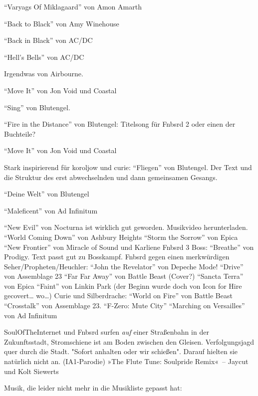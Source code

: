 “Varyags Of Miklagaard” von Amon Amarth

“Back to Black” von Amy Winehouse

“Back in Black” von AC/DC

“Hell’s Bells” von AC/DC

Irgendwas von Airbourne.

“Move It” von Jon Void und Coastal

“Sing” von Blutengel.

“Fire in the Distance” von Blutengel: Titelsong für Fnbsrd 2 oder einen der Buchteile?

“Move It” von Jon Void und Coastal

Stark inspirierend für koroljow und curie: “Fliegen” von Blutengel. Der Text und die Struktur des erst abwechselnden und dann gemeinsamen Gesangs.

“Deine Welt” von Blutengel

“Maleficent” von Ad Infinitum

“New Evil” von Nocturna ist wirklich gut geworden. Musikvideo herunterladen.
“World Coming Down” von Ashbury Heights
“Storm the Sorrow” von Epica
“New Frontier” von Miracle of Sound und Karliene
Fnbsrd 3 Boss: “Breathe” von Prodigy. Text passt gut zu Bosskampf.
Fnbsrd gegen einen merkwürdigen Seher/Propheten/Heuchler: “John the Revelator” von Depeche Mode!
“Drive” von Assemblage 23
“Far Far Away” von Battle Beast (Cover?)
“Sancta Terra” von Epica
“Faint” von Linkin Park (der Beginn wurde doch von Icon for Hire gecovert… wo…)
Curie und Silberdrache: “World on Fire” von Battle Beast
“Crosstalk” von Assemblage 23.
“F-Zero: Mute City”
“Marching on Versailles” von Ad Infinitum




SoulOfTheInternet und Fnbsrd surfen \emph{auf} einer Straßenbahn in der Zukunftsstadt, Stromschiene ist am Boden zwischen den Gleisen. Verfolgungsjagd quer durch die Stadt. "Sofort anhalten oder wir schießen". Darauf hielten sie natürlich nicht an. (IA1-Parodie) »The Flute Tune: Soulpride Remix«~– Jaycut und Kolt Siewerts


Musik, die leider nicht mehr in die Musikliste gepasst hat:

